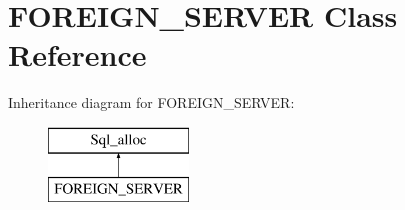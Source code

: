 \hypertarget{classFOREIGN__SERVER}{}\section{F\+O\+R\+E\+I\+G\+N\+\_\+\+S\+E\+R\+V\+ER Class Reference}
\label{classFOREIGN__SERVER}
Inheritance diagram for F\+O\+R\+E\+I\+G\+N\+\_\+\+S\+E\+R\+V\+ER\+:\begin{figure}[H]
\begin{center}
\leavevmode
\includegraphics[height=2.000000cm]{classFOREIGN__SERVER}
\end{center}
\end{figure}
